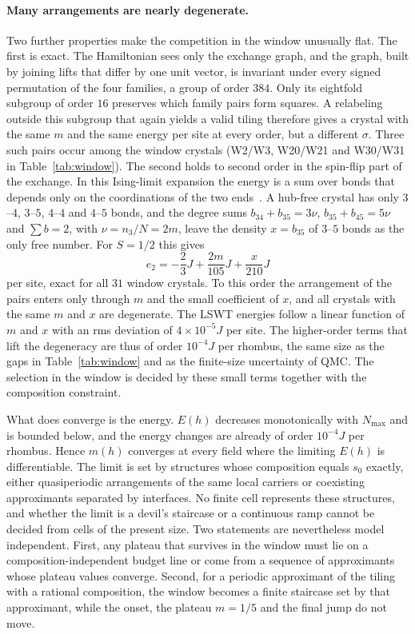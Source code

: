 \documentclass[aps,prb,twocolumn,superscriptaddress,floatfix]{revtex4-2}
\begin{document}
\paragraph*{Many arrangements are nearly degenerate.} Two further properties make the competition in the window unusually flat. The first is exact. The Hamiltonian sees only the exchange graph, and the graph, built by joining lifts that differ by one unit vector, is invariant under every signed permutation of the four families, a group of order $384$. Only its eightfold subgroup of order $16$ preserves which family pairs form squares. A relabeling outside this subgroup that again yields a valid tiling therefore gives a crystal with the same $m$ and the same energy per site at every order, but a different $\sigma$. Three such pairs occur among the window crystals (W2/W3, W20/W21 and W30/W31 in Table~\ref{tab:window}). The second holds to second order in the spin-flip part of the exchange. In this Ising-limit expansion the energy is a sum over bonds that depends only on the coordinations of the two ends~\cite{Yoo2026}. A hub-free crystal has only $3$--$4$, $3$--$5$, $4$--$4$ and $4$--$5$ bonds, and the degree sums $b_{34}+b_{35}=3\nu$, $b_{35}+b_{45}=5\nu$ and $\sum b=2$, with $\nu=n_3/N=2m$, leave the density $x=b_{35}$ of $3$--$5$ bonds as the only free number. For $S=1/2$ this gives
\begin{equation}
e_2=-\frac23J+\frac{2m}{105}J+\frac{x}{210}J
\label{eq:e2hubfree}
\end{equation}
per site, exact for all $31$ window crystals. To this order the arrangement of the pairs enters only through $m$ and the small coefficient of $x$, and all crystals with the same $m$ and $x$ are degenerate. The LSWT energies follow a linear function of $m$ and $x$ with an rms deviation of $4\times10^{-5}J$ per site. The higher-order terms that lift the degeneracy are thus of order $10^{-4}J$ per rhombus, the same size as the gaps in Table~\ref{tab:window} and as the finite-size uncertainty of QMC. The selection in the window is decided by these small terms together with the composition constraint.

What does converge is the energy. $E(h)$ decreases monotonically with $N_{\max}$ and is bounded below, and the energy changes are already of order $10^{-4}J$ per rhombus. Hence $m(h)$ converges at every field where the limiting $E(h)$ is differentiable. The limit is set by structures whose composition equals $s_0$ exactly, either quasiperiodic arrangements of the same local carriers or coexisting approximants separated by interfaces. No finite cell represents these structures, and whether the limit is a devil's staircase or a continuous ramp cannot be decided from cells of the present size. Two statements are nevertheless model independent. First, any plateau that survives in the window must lie on a composition-independent budget line or come from a sequence of approximants whose plateau values converge. Second, for a periodic approximant of the tiling with a rational composition, the window becomes a finite staircase set by that approximant, while the onset, the plateau $m=1/5$ and the final jump do not move.
\end{document}
